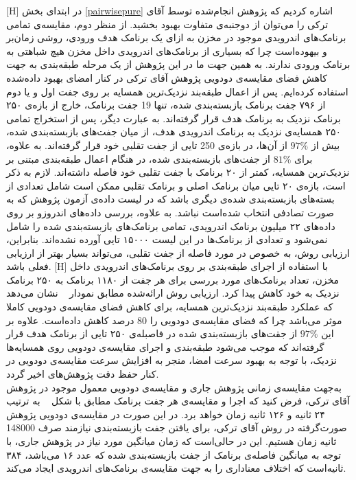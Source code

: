     [H]
 \vspace{1em}
 در ابتدای بخش 
 \ref{pairwisepure}
 اشاره‌ کردیم که پژوهش انجام‌شده توسط آقای ترکی را می‌توان از دوجنبه‌ی متفاوت بهبود بخشید. از منظر دوم، مقایسه‌ی تمامی برنامک‌های اندرویدی موجود در مخزن به ازای یک برنامک هدف ورودی، روشی زمان‌بر و بیهوده‌است چرا که بسیاری از برنامک‌های اندرویدی داخل مخزن هیچ‌ شباهتی به برنامک ورودی ندارند. به همین جهت ما در این پژوهش از یک مرحله‌ طبقه‌بندی به جهت کاهش فضای مقایسه‌ی دودویی پژوهش آقای ترکی در کنار امضای بهبود داده‌شده استفاده کرده‌ایم. پس از اعمال طبقه‌بند نزدیک‌ترین همسایه بر روی جفت اول و یا دوم از ۷۹۶ جفت برنامک بازبسته‌بندی شده، تنها 19 جفت برنامک، خارج از بازه‌ی ۲۵۰ برنامک نزدیک به
 برنامک هدف قرار گرفته‌اند. به عبارت دیگر، پس از استخراج تمامی ۲۵۰ همسایه‌ی نزدیک به برنامک اندرویدی هدف، از میان جفت‌های بازبسته‌بندی شده، بیش از $97\%$ از آن‌ها،  در بازه‌ی 250 تایی از جفت تقلبی خود قرار گرفته‌اند. به علاوه، برای  $81\%$ از جفت‌های بازبسته‌بندی شده، در هنگام اعمال طبقه‌بندی مبتنی بر نزدیک‌ترین همسایه، کمتر از ۲۰ برنامک با جفت تقلبی خود فاصله داشته‌اند. لازم به ذکر است، بازه‌ی ۲۰ تایی میان برنامک اصلی و برنامک تقلبی ممکن است شامل تعدادی از بسته‌های بازبسته‌بندی شده‌ی دیگری باشد که در لیست داده‌ی آزمون پژوهش که به صورت تصادفی انتخاب شده‌است نباشد. به علاوه، بررسی داده‌های اندروزو بر روی داده‌‌های ۲۲ میلیون برنامک اندرویدی، تمامی برنامک‌های بازبسته‌بندی شده را شامل نمی‌شود و تعدادی از برنامک‌ها در این لیست ۱۵۰۰۰ تایی آورده نشده‌اند. بنابراین، ارزیابی روش، به خصوص در مورد فاصله از جفت تقلبی، می‌تواند بسیار بهتر از ارزیابی فعلی باشد. 
     [H]
 \vspace{1em}
با استفاده از اجرای طبقه‌بندی بر روی برنامک‌های اندرویدی داخل مخزن، تعداد برنامک‌های مورد بررسی برای هر جفت از ۱۱۸۰ برنامک به ۲۵۰ برنامک نزدیک به خود کاهش پیدا کرد. ارزیابی روش ارائه‌شده مطابق نمودار ~ نشان می‌دهد که عملکرد طبقه‌بند نزدیک‌ترین همسایه، برای کاهش فضای مقایسه‌ی دودویی کاملا موثر می‌باشد چرا که فضای مقایسه‌ی دودویی را 80 درصد کاهش داده‌است. علاوه‌ بر این $97\%$ از جقت‌های بازبسته‌بندی شده در فاصبله‌ی ۲۵۰ تایی از برنامک هدف قرار گرفته‌اند که موجب می‌شود طبقه‌بندی و اجرای مقایسه‌ی دودویی روی همسایه‌ها نزدیک، با توجه به بهبود سرعت امضا، منجر به افزایش سرعت مقایسه‌ی دودویی در کنار حفظ دقت پژوهش‌های اخیر گردد. \\
به‌جهت مقایسه‌ی زمانی پژوهش جاری و مقایسه‌ی دودویی معمول موجود در پژوهش آقای ترکی، فرض کنید که اجرا و مقایسه‌ی هر جفت برنامک مطابق با شکل ~  به ترتیب ۲۴ ثانیه و ۱۲۶ ثانیه زمان خواهد برد. در این صورت در مقایسه‌ی دودویی پژوهش صورت‌گرفته در روش آقای ترکی، برای یافتن جفت بازبسته‌بندی نیازمند صرف 148000 ثانیه زمان هستیم. این در حالی‌است که زمان میانگین مورد نیاز در پژوهش جاری، با توجه به میانگین فاصله‌ی برنامک از جفت بازبسته‌بندی شده که عدد ۱۶ می‌باشد، ۳۸۴ ثانیه‌است که اختلاف معناداری را به جهت مقایسه‌ی برنامک‌های اندرویدی ایجاد می‌کند. 

